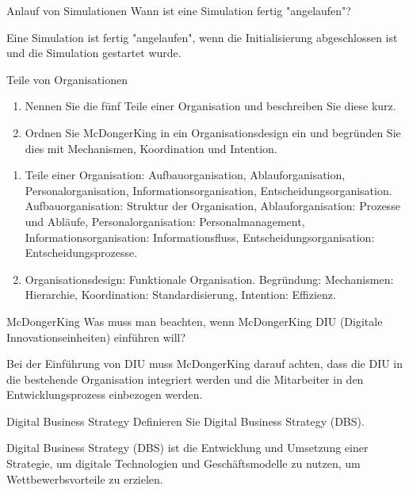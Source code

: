 \documentclass{article}
\begin{document}
\begin{exercise}{Anlauf von Simulationen}
  Wann ist eine Simulation fertig "angelaufen"?

  \begin{solution}
    Eine Simulation ist fertig "angelaufen", wenn die Initialisierung abgeschlossen ist und die Simulation gestartet wurde.
  \end{solution}
\end{exercise}

\begin{exercise}{Teile von Organisationen}
  \begin{enumerate}
    \item Nennen Sie die fünf Teile einer Organisation und beschreiben Sie diese kurz.
    \item Ordnen Sie McDongerKing in ein Organisationsdesign ein und begründen Sie dies mit Mechanismen, Koordination und Intention.
  \end{enumerate}

  \begin{solution}
    \begin{enumerate}
      \item Teile einer Organisation: Aufbauorganisation, Ablauforganisation, Personalorganisation, Informationsorganisation, Entscheidungsorganisation. Aufbauorganisation: Struktur der Organisation, Ablauforganisation: Prozesse und Abläufe, Personalorganisation: Personalmanagement, Informationsorganisation: Informationsfluss, Entscheidungsorganisation: Entscheidungsprozesse.
      \item Organisationsdesign: Funktionale Organisation. Begründung: Mechanismen: Hierarchie, Koordination: Standardisierung, Intention: Effizienz.
    \end{enumerate}
  \end{solution}
\end{exercise}

\begin{exercise}{McDongerKing}
  Was muss man beachten, wenn McDongerKing DIU (Digitale Innovationseinheiten) einführen will?

  \begin{solution}
    Bei der Einführung von DIU muss McDongerKing darauf achten, dass die DIU in die bestehende Organisation integriert werden und die Mitarbeiter in den Entwicklungsprozess einbezogen werden.
  \end{solution}
\end{exercise}

\begin{exercise}{Digital Business Strategy}
  Definieren Sie Digital Business Strategy (DBS).

  \begin{solution}
    Digital Business Strategy (DBS) ist die Entwicklung und Umsetzung einer Strategie, um digitale Technologien und Geschäftsmodelle zu nutzen, um Wettbewerbsvorteile zu erzielen.
  \end{solution}
\end{exercise}
\end{document}
